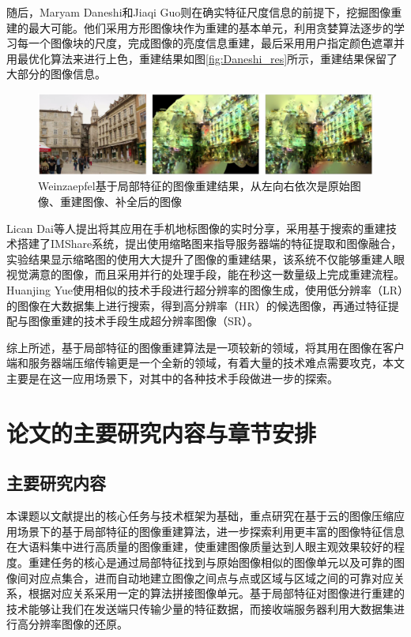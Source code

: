 随后，Maryam Daneshi和Jiaqi Guo\cite{Daneshi:2011wi}则在确实特征尺度信息的前提下，挖掘图像重建的最大可能。他们采用方形图像块作为重建的基本单元，利用贪婪算法逐步的学习每一个图像块的尺度，完成图像的亮度信息重建，最后采用用户指定颜色遮罩并用最优化算法来进行上色，重建结果如图\ref{fig:Daneshi_res}所示，重建结果保留了大部分的图像信息。

\begin{figure}
\centering\includegraphics[width=15cm]{imgs/ch1/Weinzaepfel_res}
\caption{Weinzaepfel基于局部特征的图像重建结果，从左向右依次是原始图像、重建图像、补全后的图像}
\label{fig:Weinzaepfel_res}
\end{figure}

Lican Dai等人提出将其应用在手机地标图像的实时分享\cite{Dai:2012vn}，采用基于搜索的重建技术搭建了IMShare系统，提出使用缩略图来指导服务器端的特征提取和图像融合，实验结果显示缩略图的使用大大提升了图像的重建结果，该系统不仅能够重建人眼视觉满意的图像，而且采用并行的处理手段，能在秒这一数量级上完成重建流程。Huanjing Yue使用相似的技术手段进行超分辨率的图像生成，使用低分辨率（LR）的图像在大数据集上进行搜索，得到高分辨率（HR）的候选图像，再通过特征提配与图像重建的技术手段生成超分辨率图像（SR）。

综上所述，基于局部特征的图像重建算法是一项较新的领域，将其用在图像在客户端和服务器端压缩传输更是一个全新的领域，有着大量的技术难点需要攻克，本文主要是在这一应用场景下，对其中的各种技术手段做进一步的探索。

\section{论文的主要研究内容与章节安排}
\subsection{主要研究内容}

本课题以文献\cite{Yue:2013gl}提出的核心任务与技术框架为基础，重点研究在基于云的图像压缩应用场景下的基于局部特征的图像重建算法，进一步探索利用更丰富的图像特征信息在大语料集中进行高质量的图像重建，使重建图像质量达到人眼主观效果较好的程度。重建任务的核心是通过局部特征找到与原始图像相似的图像单元以及可靠的图像间对应点集合，进而自动地建立图像之间点与点或区域与区域之间的可靠对应关系，根据对应关系采用一定的算法拼接图像单元。基于局部特征对图像进行重建的技术能够让我们在发送端只传输少量的特征数据，而接收端服务器利用大数据集进行高分辨率图像的还原。

